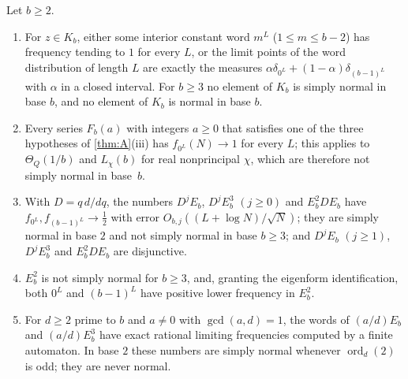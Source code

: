 \documentclass[11pt]{article}
\DeclareMathOperator{\ord}{ord}
\begin{document}
\begin{maintheorem}\label{thm:F}
Let $b\ge2$.
\begin{enumerate}[label=\textup{(\roman*)},nosep]
\item For $z\in K_b$, either some interior constant word $m^L$ ($1\le m\le b-2$) has
frequency tending to $1$ for every $L$, or the limit points of the word
distribution of length $L$ are exactly the measures
$\alpha\delta_{0^L}+(1-\alpha)\delta_{(b-1)^L}$ with $\alpha$ in a closed interval.
For $b\ge3$ no element of $K_b$ is simply normal in base $b$, and no element of
$K_b$ is normal in base $b$.
\item Every series $F_b(a)$ with integers $a\ge0$ that satisfies one of the three
hypotheses of \cref{thm:A}(iii) has $f_{0^L}(N)\to1$ for every $L$; this applies to $\Theta_Q(1/b)$ and $L_\chi(b)$ for real
nonprincipal $\chi$, which are therefore not simply normal in base~$b$.
\item With $D=q\,d/dq$, the numbers $D^jE_b$, $D^jE_b^3$ $(j\ge0)$ and $E_b^2DE_b$
have $f_{0^L},f_{(b-1)^L}\to\frac12$ with error $O_{b,j}((L+\log N)/\sqrt N)$; they
are simply normal in base $2$ and not simply normal in base $b\ge3$; and
$D^jE_b$ $(j\ge1)$, $D^jE_b^3$ and $E_b^2DE_b$ are disjunctive.
\item $E_b^2$ is not simply normal for $b\ge3$, and, granting the eigenform
identification, both $0^L$ and $(b-1)^L$ have positive lower frequency in $E_b^2$.
\item For $d\ge2$ prime to $b$ and $a\ne0$ with $\gcd(a,d)=1$, the words of
$(a/d)E_b$ and $(a/d)E_b^3$ have exact rational limiting frequencies computed by a
finite automaton. In base $2$ these numbers are simply normal whenever $\ord_d(2)$
is odd; they are never normal.
\end{enumerate}
\end{maintheorem}
\end{document}
